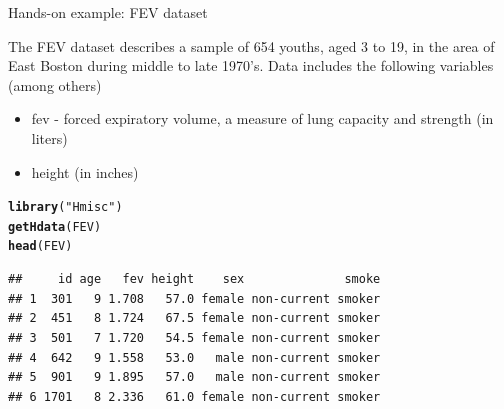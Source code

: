 \documentclass[table]{beamer}\usepackage[]{graphicx}\usepackage[]{color}
\makeatletter
\newcommand{\hlstr}[1]{\textcolor[rgb]{0.192,0.494,0.8}{#1}}%
\newcommand{\hlstd}[1]{\textcolor[rgb]{0.345,0.345,0.345}{#1}}%
\newcommand{\hlkwd}[1]{\textcolor[rgb]{0.737,0.353,0.396}{\textbf{#1}}}%
\newenvironment{kframe}{%
 \def\at@end@of@kframe{}%
 \ifinner\ifhmode%
  \def\at@end@of@kframe{\end{minipage}}%
  \begin{minipage}{\columnwidth}%
 \fi\fi%
 \def\FrameCommand##1{\hskip\@totalleftmargin \hskip-\fboxsep
 \colorbox{shadecolor}{##1}\hskip-\fboxsep
     \hskip-\linewidth \hskip-\@totalleftmargin \hskip\columnwidth}%
 \MakeFramed {\advance\hsize-\width
   \@totalleftmargin\z@ \linewidth\hsize
   \@setminipage}}%
 {\par\unskip\endMakeFramed%
 \at@end@of@kframe}
\newenvironment{knitrout}{}{} %
\makeatother
\begin{document}
\begin{frame}[fragile]{Hands-on example: FEV dataset}

The FEV dataset describes a sample of 654 youths, aged 3 to 19, in the area of East Boston during middle to late 1970's. Data includes the following variables (among others)

\begin{itemize}
  \item fev - forced expiratory volume, a measure of lung capacity and strength (in liters)
  \item height (in inches)
\end{itemize}

\scriptsize
\begin{knitrout}\footnotesize
{}\color{fgcolor}\begin{kframe}
\begin{alltt}
\hlkwd{library}\hlstd{(}\hlstr{"Hmisc"}\hlstd{)}
\hlkwd{getHdata}\hlstd{(FEV)}
\hlkwd{head}\hlstd{(FEV)}
\end{alltt}
\begin{verbatim}
##     id age   fev height    sex              smoke
## 1  301   9 1.708   57.0 female non-current smoker
## 2  451   8 1.724   67.5 female non-current smoker
## 3  501   7 1.720   54.5 female non-current smoker
## 4  642   9 1.558   53.0   male non-current smoker
## 5  901   9 1.895   57.0   male non-current smoker
## 6 1701   8 2.336   61.0 female non-current smoker
\end{verbatim}
\end{kframe}
\end{knitrout}

\end{frame}


\end{document}
